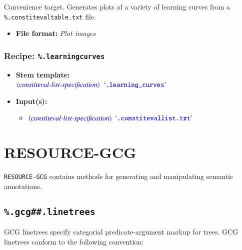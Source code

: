 \documentclass[12pt]{report}
\def\blue{\color{blue}}
\begin{document}
Convenience target. Generates plots of a variety of learning curves from a {\blue\tt \%.constitevaltable.txt} file.

\begin{itemize}
      \item \textbf{File format:} \textit{Plot images}
\end{itemize}

\subsection{Recipe: {\blue\tt \%.learning\textunderscore curves}}

\begin{itemize}
      \item \textbf{Stem template:}\\
      $\dtype{constiteval-list-specification}$ $\dcode{.learning\textunderscore curves}$
      \item \textbf{Input(s):}
      \begin{itemize}
            \item $\dtype{constiteval-list-specification}$ $\dcode{.constitevallist.txt}$
      \end{itemize}
\end{itemize}



\chapter{RESOURCE-GCG}

{\tt RESOURCE-GCG} contains methods for generating and manipulating semantic annotations.

\section{\blue\tt \%.gcg\#\#.linetrees}

GCG linetrees specify categorial predicate-argument markup for trees.
%
GCG linetrees conform to the following convention:
\end{document}
